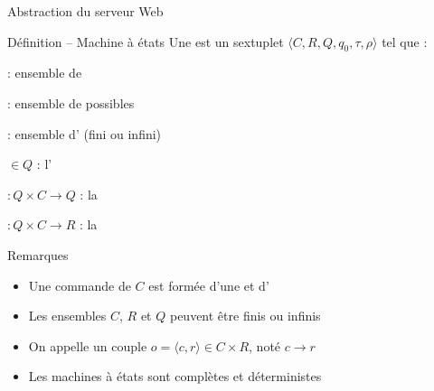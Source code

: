 
\begingroup


\begin{frame}{Abstraction du serveur Web}

  \begin{block}{Définition -- Machine à états}
    \vspace{3mm}
    Une  est un sextuplet \alert{$\langle C, R, Q, q_0, \tau, \rho \rangle$} tel que :
    \begin{description}[xxxxx]
    \item[\alert{$C$}] : ensemble de  
      \hfill {\footnotesize {}}
    \item[\alert{$R$}] : ensemble de  possibles
      \hfill {\footnotesize {}}
    \item[\alert{$Q$}] : ensemble d' (fini ou infini)
      \hfill {\footnotesize {}}
    \item[\alert{$q_0$}] $\in Q$ : l'
      \hfill {\footnotesize {}}
    \item[\alert{$\tau$}] $: Q \times C \rightarrow Q$ : la 
      \hfill {\footnotesize{}}
    \item[\alert{$\rho$}] $: Q \times C \rightarrow R$ : la 
      \hfill {\footnotesize{}}
    \end{description}
  \end{block}

  \begin{block}{Remarques}
    \begin{itemize}
    \item Une commande de $C$ est formée d'une  et d'
    \item Les ensembles $C$, $R$ et $Q$ peuvent être finis ou infinis
    \item On appelle  un couple $o = \langle c, r\rangle \in C \times R$, noté $c \rightarrow r$
    \item Les machines à états sont complètes et déterministes
    \end{itemize}
  \end{block}
  
  
\end{frame}

\endgroup
\endinput


